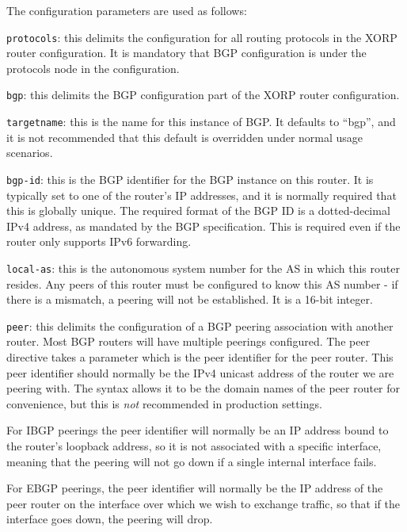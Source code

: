 \noindent
The configuration parameters are used as follows:
\begin{description}
\item{\tt protocols}: this delimits the configuration for all routing
  protocols in the XORP router configuration.  It is mandatory that
  BGP configuration is under the {\stt protocols} node in the
  configuration.
\item{\tt bgp}: this delimits the BGP configuration part of the XORP
  router configuration.
\item{\tt targetname}: this is the name for this instance of BGP.  It
  defaults to ``{\stt bgp}'', and it is not recommended that this
  default is overridden under normal usage scenarios.
\item{\tt bgp-id}: this is the BGP identifier for the BGP instance on
  this router.  It is typically set to one of the router's IP
  addresses, and it is normally required that this is globally unique.
  The required format of the BGP ID is a dotted-decimal IPv4 address,
  as mandated by the BGP specification.  This is required even if the
  router only supports IPv6 forwarding.
\item{\tt local-as}: this is the autonomous system number for the AS
  in which this router resides.  Any peers of this router must be
  configured to know this AS number - if there is a mismatch, a
  peering will not be established.  It is a 16-bit integer.
\item{\tt peer}: this delimits the configuration of a BGP peering
  association with another router.  Most BGP routers will have
  multiple peerings configured.  The {\stt peer} directive takes a
  parameter which is the peer identifier for the peer router. This
  peer identifier should normally be the IPv4 unicast address of the
  router we are peering with.  The syntax allows it to be the domain
  names of the peer router for convenience, but this is {\it not}
  recommended in production settings.  

  For IBGP peerings the peer identifier will normally be an IP address
  bound to the router's loopback address, so it is not associated with
  a specific interface, meaning that the peering will not go down if a
  single internal interface fails.  

  For EBGP peerings, the peer identifier will normally be the IP
  address of the peer router on the interface over which we wish to
  exchange traffic, so that if the interface goes down, the peering
  will drop.


\end{description}
